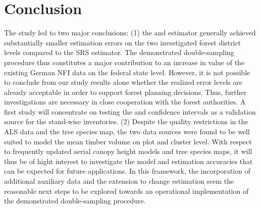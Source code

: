 \section{Conclusion}
\label{sec:concl}

The study led to two major conclusions: (1) the \extpsynth{} and \psmall{} estimator generally achieved substantially smaller estimation errors on the two investigated forest district levels compared to the SRS estimator. The demonstrated double-sampling procedure thus constitutes a major contribution to an increase in value of the existing German NFI data on the federal state level. However, it is not possible to conclude from our study results alone whether the realized error levels are already acceptable in order to support forest planning decisions. Thus, further investigations are necessary in close cooperation with the forest authorities. A first study will concentrate on testing the \extpsynth{} and \psmall{} confidence intervals as a validation source for the stand-wise inventories. (2) Despite the quality restrictions in the ALS data and the tree species map, the two data sources were found to be well suited to model the mean timber volume on plot and cluster level. With respect to frequently updated aerial canopy height models and tree species maps, it will thus be of hight interest to investigate the model and estimation accuracies that can be expected for future applications. In this framework, the incorporation of additional auxiliary data and the extension to change estimation seem the reasonable next steps to be explored towards an operational implementation of the demonstrated double-sampling procedure.



